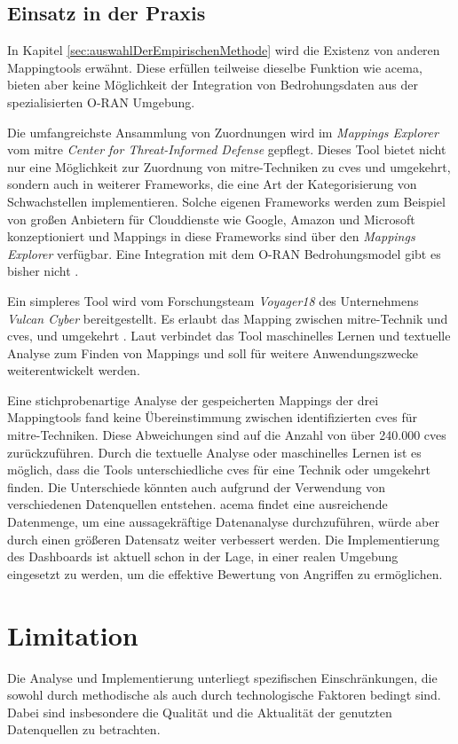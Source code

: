 \subsection{Einsatz in der Praxis}
In Kapitel \ref{sec:auswahlDerEmpirischenMethode} wird die Existenz von anderen Mappingtools erwähnt. Diese erfüllen teilweise dieselbe Funktion wie \gls{acema}, bieten aber keine Möglichkeit der Integration von Bedrohungsdaten aus der spezialisierten O-RAN Umgebung. 
\par Die umfangreichste Ansammlung von Zuordnungen wird im \textit{Mappings Explorer} vom \gls{mitre} \textit{Center for Threat-Informed Defense} gepflegt. Dieses Tool bietet nicht nur eine Möglichkeit zur Zuordnung von \gls{mitre}-Techniken zu \glspl{cve} und umgekehrt, sondern auch in weiterer Frameworks, die eine Art der Kategorisierung von Schwachstellen implementieren. Solche eigenen Frameworks werden zum Beispiel von großen Anbietern für Clouddienste wie Google, Amazon und Microsoft konzeptioniert und Mappings in diese Frameworks sind über den \textit{Mappings Explorer} verfügbar. Eine Integration mit dem O-RAN Bedrohungsmodel gibt es bisher nicht \autocite{HomeMappingsExplorer}.
\par Ein simpleres Tool wird vom Forschungsteam \textit{Voyager18} des Unternehmens \textit{Vulcan Cyber} bereitgestellt. Es erlaubt das Mapping zwischen \gls{mitre}-Technik und \glspl{cve}, und umgekehrt \autocite{Vulcan}. Laut \autocite{keizmanMITREATTCKFramework2022} verbindet das Tool maschinelles Lernen und textuelle Analyse zum Finden von Mappings und soll für weitere Anwendungszwecke weiterentwickelt werden.
\par Eine stichprobenartige Analyse der gespeicherten Mappings der drei Mappingtools fand keine Übereinstimmung zwischen identifizierten \glspl{cve} für \gls{mitre}-Techniken. Diese Abweichungen sind auf die Anzahl von über 240.000 \glspl{cve} zurückzuführen. Durch die textuelle Analyse oder maschinelles Lernen ist es möglich, dass die Tools unterschiedliche \glspl{cve} für eine Technik oder umgekehrt finden. Die Unterschiede könnten auch aufgrund der Verwendung von verschiedenen Datenquellen entstehen.
\gls{acema} findet eine ausreichende Datenmenge, um eine aussagekräftige Datenanalyse durchzuführen, würde aber durch einen größeren Datensatz weiter verbessert werden. Die Implementierung des Dashboards ist aktuell schon in der Lage, in einer realen Umgebung eingesetzt zu werden, um die effektive Bewertung von Angriffen zu ermöglichen.

\section{Limitation}
\label{sec:limitationen}
Die Analyse und Implementierung unterliegt spezifischen Einschränkungen, die sowohl durch methodische als auch durch technologische Faktoren bedingt sind. Dabei sind insbesondere die Qualität und die Aktualität der genutzten Datenquellen zu betrachten.
